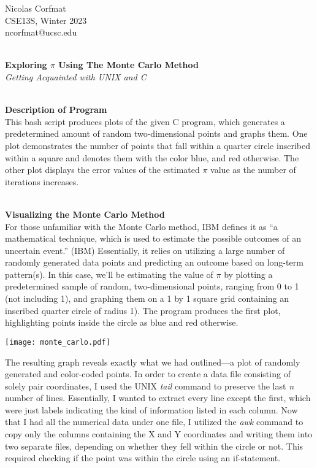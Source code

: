 \documentclass[12pt]{article}
\begin{document}
\flushright
Nicolas Corfmat \\CSE13S, Winter 2023 \\ ncorfmat@ucsc.edu

\flushleft
\LARGE
\textbf{\\Exploring $\pi$ Using The Monte Carlo Method}
\large
\\\textit{Getting Acquainted with UNIX and C}

\large
\textbf{\\Description of Program}
\normalsize
\\This bash script produces plots of the given C program, which generates a predetermined amount of random two-dimensional points and graphs them. One plot demonstrates the number of points that fall within a quarter circle inscribed within a square and denotes them with the color blue, and red otherwise. The other plot displays the error values of the estimated $\pi$ value as the number of iterations increases.

\large
\textbf{\\Visualizing the Monte Carlo Method}
\normalsize
\\For those unfamiliar with the Monte Carlo method, IBM defines it as \enquote{a mathematical technique, which is used to estimate the possible outcomes of an uncertain event.} (IBM) Essentially, it relies on utilizing a large number of randomly generated data points and predicting an outcome based on long-term pattern(s). In this case, we'll be estimating the value of $\pi$ by plotting a predetermined sample of random, two-dimensional points, ranging from 0 to 1 (not including 1), and graphing them on a 1 by 1 square grid containing an inscribed quarter circle of radius 1). The program produces the first plot, highlighting points inside the circle as blue and red otherwise.

\texttt{[image: monte\_carlo.pdf]}

The resulting graph reveals exactly what we had outlined---a plot of randomly generated and color-coded points. In order to create a data file consisting of solely pair coordinates, I used the UNIX \textit{tail} command to preserve the last \textit{n} number of lines. Essentially, I wanted to extract every line except the first, which were just labels indicating the kind of information listed in each column. Now that I had all the numerical data under one file, I utilized the \textit{awk} command to copy only the columns containing the X and Y coordinates and writing them into two separate files, depending on whether they fell within the circle or not. This required checking if the point was within the circle using an if-statement.
\end{document}

